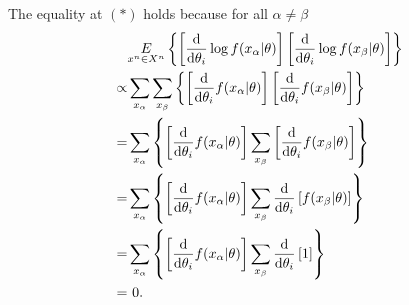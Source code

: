 The equality at $(*)$ holds because for all $\alpha \neq \beta$
\begin{equation}
	\begin{split}
		&\underset{x^n \in X^n}{E} \left\{ \left[\frac{\mathrm{d}}{\mathrm{d}\theta_i} \log f(x_\alpha|\theta)\right]\left[\frac{\mathrm{d}}{\mathrm{d}\theta_i} \log f(x_\beta|\theta)\right]\right\} \\
		\propto& \sum_{x_\alpha}\sum_{x_\beta} \left\{ \left[\frac{\mathrm{d}}{\mathrm{d}\theta_i}  f(x_\alpha|\theta)\right]\left[\frac{\mathrm{d}}{\mathrm{d}\theta_i}  f(x_\beta|\theta)\right]\right\}\\
		=& \sum_{x_\alpha} \left\{ \left[\frac{\mathrm{d}}{\mathrm{d}\theta_i}  f(x_\alpha|\theta)\right]\sum_{x_\beta}\left[\frac{\mathrm{d}}{\mathrm{d}\theta_i}  f(x_\beta|\theta)\right]\right\}\\
		=& \sum_{x_\alpha} \left\{ \left[\frac{\mathrm{d}}{\mathrm{d}\theta_i}  f(x_\alpha|\theta)\right]\sum_{x_\beta}\frac{\mathrm{d}}{\mathrm{d}\theta_i}\left[  f(x_\beta|\theta)\right]\right\}\\
		=& \sum_{x_\alpha} \left\{ \left[\frac{\mathrm{d}}{\mathrm{d}\theta_i}  f(x_\alpha|\theta)\right]\sum_{x_\beta}\frac{\mathrm{d}}{\mathrm{d}\theta_i}\left[ 1\right]\right\}\\
		=&\ 0.
	\end{split}
\end{equation}
